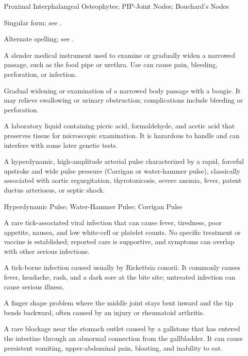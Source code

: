 \synonyms
Proximal Interphalangeal Osteophytes; PIP-Joint Nodes; Bouchard's Nodes

 Singular form; see .

 Alternate spelling; see .

 A slender medical instrument used to examine or gradually widen a narrowed passage, such as the food pipe or urethra. Use can cause pain, bleeding, perforation, or infection.

 Gradual widening or examination of a narrowed body passage with a bougie. It may relieve swallowing or urinary obstruction; complications include bleeding or perforation.

 A laboratory liquid containing picric acid, formaldehyde, and acetic acid that preserves tissue for microscopic examination. It is hazardous to handle and can interfere with some later genetic tests.

 A hyperdynamic, high-amplitude arterial pulse characterized by a rapid, forceful upstroke and wide pulse pressure (Corrigan or water-hammer pulse), classically associated with aortic regurgitation, thyrotoxicosis, severe anemia, fever, patent ductus arteriosus, or septic shock.

\synonyms
Hyperdynamic Pulse; Water-Hammer Pulse; Corrigan Pulse

 A rare tick-associated viral infection that can cause fever, tiredness, poor appetite, nausea, and low white-cell or platelet counts. No specific treatment or vaccine is established; reported care is supportive, and symptoms can overlap with other serious infections.

 A tick-borne infection caused usually by Rickettsia conorii. It commonly causes fever, headache, rash, and a dark sore at the bite site; untreated infection can cause serious illness.

 A finger shape problem where the middle joint stays bent inward and the tip bends backward, often caused by an injury or rheumatoid arthritis.

 A rare blockage near the stomach outlet caused by a gallstone that has entered the intestine through an abnormal connection from the gallbladder. It can cause persistent vomiting, upper-abdominal pain, bloating, and inability to eat.

